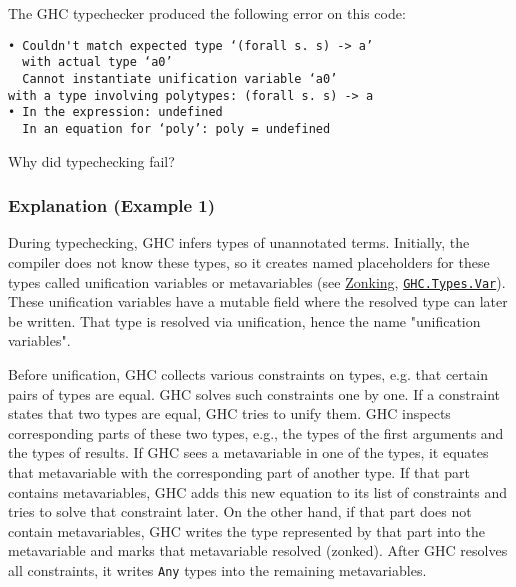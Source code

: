 The GHC typechecker produced the following error on this code:

\begin{verbatim}
• Couldn't match expected type ‘(forall s. s) -> a’
  with actual type ‘a0’
  Cannot instantiate unification variable ‘a0’
with a type involving polytypes: (forall s. s) -> a
• In the expression: undefined
  In an equation for ‘poly’: poly = undefined
\end{verbatim}

Why did typechecking fail?

\subsubsection{Explanation (Example 1)}



During typechecking, GHC infers types of unannotated terms.
Initially, the compiler does not know these types, so it creates named placeholders for these types called unification variables or metavariables (see \href{https://gitlab.haskell.org/ghc/ghc/-/wikis/Zonking}{Zonking}, \href{https://github.com/ghc/ghc/blob/ed38c09bd89307a7d3f219e1965a0d9743d0ca73/compiler/GHC/Types/Var.hs#L169}{\texttt{GHC.Types.Var}}).
These unification variables have a mutable field where the resolved type can later be written.
That type is resolved via unification, hence the name "unification variables".

Before unification, GHC collects various constraints on types, e.g. that certain pairs of types are equal.
GHC solves such constraints one by one.
If a constraint states that two types are equal, GHC tries to unify them.
GHC inspects corresponding parts of these two types, e.g., the types of the first arguments and the types of results.
If GHC sees a metavariable in one of the types, it equates that metavariable with the corresponding part of another type.
If that part contains metavariables, GHC adds this new equation to its list of constraints and tries to solve that constraint later.
On the other hand, if that part does not contain metavariables, GHC writes the type represented by that part into the metavariable and marks that metavariable resolved (zonked).
After GHC resolves all constraints, it writes \texttt{Any} types into the remaining metavariables.


